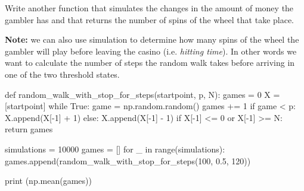 \documentclass[12pt,a4paper]{book}
\begin{document}
\begin{exercise}[subtitle={Spin to End (\texttt{python})}]
Write another function that simulates the changes in the amount of money the gambler has and that returns the number of spins of the wheel that take place.

\textbf{Note: } we can also use simulation to determine how many spins of the wheel the gambler will play before leaving the casino (i.e. \emph{hitting time}).
In other words we want to calculate the number of steps the random walk takes before arriving in one of the two threshold states.
\end{exercise}
\begin{solution}
\begin{ipython}
def random_walk_with_stop_for_steps(startpoint, p, N):
    games = 0
    X = [startpoint]
    while True:
        game = np.random.random()
        games += 1
        if game < p:
            X.append(X[-1] + 1)
        else:
            X.append(X[-1] - 1)
        if X[-1] <= 0 or X[-1] >= N:
            return games

simulations = 10000
games = []
for _ in range(simulations):
    games.append(random_walk_with_stop_for_steps(100, 0.5, 120))

print (np.mean(games))
\end{ipython}
\end{solution}
\end{document}
